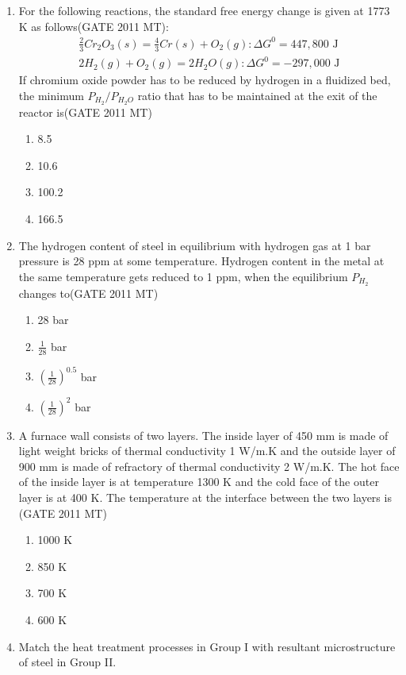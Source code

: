\documentclass[12pt]{article}
\begin{document}
\begin{enumerate}
\item For the following reactions, the standard free energy change is given at 1773 K as follows(GATE 2011 MT):
\begin{align*}
\frac{2}{3} Cr_2O_3 (s) = \frac{4}{3} Cr (s) + O_2 (g) : \Delta G^0 = 447,800 \text{ J} \\
2 H_2 (g) + O_2 (g) = 2 H_2O (g) : \Delta G^0 = -297,000 \text{ J}
\end{align*}
If chromium oxide powder has to be reduced by hydrogen in a fluidized bed, the minimum $P_{H_2} / P_{H_2O}$ ratio that has to be maintained at the exit of the reactor is(GATE 2011 MT)
    \begin{enumerate}
        \item 8.5
        \item 10.6
        \item 100.2
        \item 166.5
    \end{enumerate}
\item The hydrogen content of steel in equilibrium with hydrogen gas at 1 bar pressure is 28 ppm at some temperature. Hydrogen content in the metal at the same temperature gets reduced to 1 ppm, when the equilibrium $P_{H_2}$ changes to(GATE 2011 MT)
    \begin{enumerate}
        \item 28 bar
        \item $\frac{1}{28}$ bar
        \item $\left(\frac{1}{28}\right)^{0.5}$ bar
        \item $\left(\frac{1}{28}\right)^2$ bar
    \end{enumerate}
\item A furnace wall consists of two layers. The inside layer of 450 mm is made of light weight bricks of thermal conductivity 1 W/m.K and the outside layer of 900 mm is made of refractory of thermal conductivity 2 W/m.K. The hot face of the inside layer is at temperature 1300 K and the cold face of the outer layer is at 400 K. The temperature at the interface between the two layers is (GATE 2011 MT)
    \begin{enumerate}
        \item 1000 K
        \item 850 K
        \item 700 K
        \item 600 K
    \end{enumerate}
\item Match the heat treatment processes in Group I with resultant microstructure of steel in Group II.

\end{enumerate}
\end{document}
